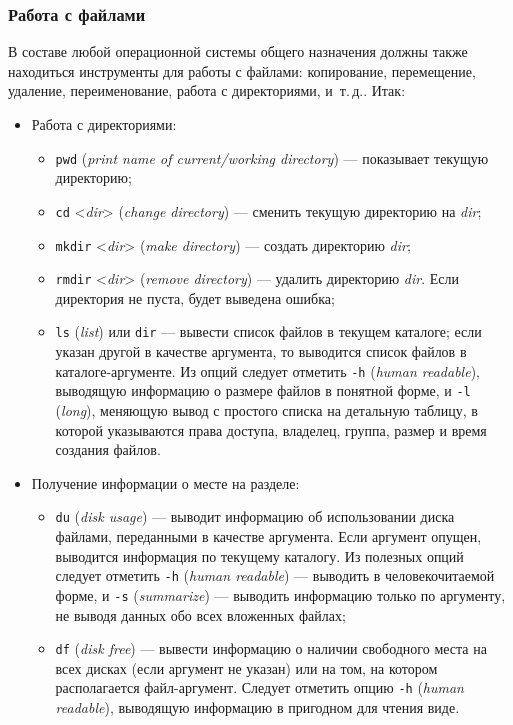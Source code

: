 \subsubsection{Работа с файлами}\label{base:os:structure:userutils:files}
В составе любой операционной системы общего назначения должны также находиться инструменты для работы с файлами: копирование, перемещение, удаление, переименование, работа с директориями, и~т.\,д..
Итак:
\begin{itemize}
 \item Работа с директориями:
  \begin{itemize}
   \item \texttt{pwd} (\emph{print name of current/working directory}) --- показывает текущую директорию;
   \item \texttt{cd} <\emph{dir}> (\emph{change directory}) --- сменить текущую директорию на \emph{dir};
   \item \texttt{mkdir} <\emph{dir}> (\emph{make directory}) --- создать директорию \emph{dir};
   \item \texttt{rmdir} <\emph{dir}> (\emph{remove directory}) --- удалить директорию \emph{dir}. Если директория не пуста, будет выведена ошибка;
   \item \texttt{ls} (\emph{list}) или \texttt{dir} --- вывести список файлов в текущем каталоге; если указан другой в качестве аргумента, то выводится список файлов в каталоге-аргументе. Из опций следует отметить \texttt{-h} (\emph{human readable}), выводящую информацию о размере файлов в понятной форме, и \texttt{-l} (\emph{long}), меняющую вывод с простого списка на детальную таблицу, в которой указываются права доступа, владелец, группа, размер и время создания файлов.
  \end{itemize}
 \item Получение информации о месте на разделе:
  \begin{itemize}
   \item \texttt{du} (\emph{disk usage}) --- выводит информацию об использовании диска файлами, переданными в качестве аргумента. Если аргумент опущен, выводится информация по текущему каталогу. Из полезных опций следует отметить \texttt{-h} (\emph{human readable}) --- выводить в человекочитаемой форме, и \texttt{-s} (\emph{summarize}) --- выводить информацию только по аргументу, не выводя данных обо всех вложенных файлах;
   \item \texttt{df} (\emph{disk free}) --- вывести информацию о наличии свободного места на всех дисках (если аргумент не указан) или на том, на котором располагается файл-аргумент. Следует отметить опцию \texttt{-h} (\emph{human readable}), выводящую информацию в пригодном для чтения виде.

\end{itemize}
\end{itemize}
